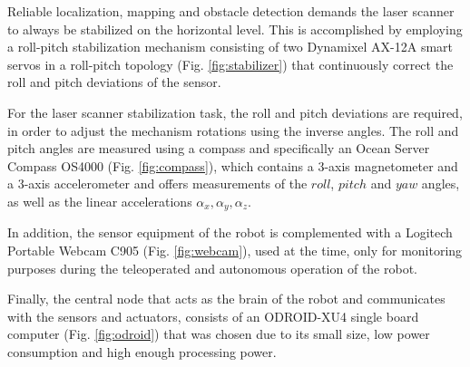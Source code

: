\documentclass[conference]{IEEEtran}
\begin{document}
Reliable localization, mapping and obstacle detection demands the laser scanner to always be stabilized on the horizontal level. This is accomplished by employing a roll-pitch stabilization mechanism consisting of two Dynamixel AX-12A smart servos in a roll-pitch topology (Fig. \ref{fig:stabilizer}) that continuously correct the roll and pitch deviations of the sensor.

For the laser scanner stabilization task, the roll and pitch deviations are required, in order to adjust the mechanism rotations using the inverse angles. The roll and pitch angles are measured using a compass and specifically an Ocean Server Compass OS4000 (Fig. \ref{fig:compass}), which contains a 3-axis magnetometer and a 3-axis accelerometer and offers measurements of the $roll$, $pitch$ and $yaw$ angles, as well as the linear accelerations $\alpha_x, \alpha_y, \alpha_z$.

In addition, the sensor equipment of the robot is complemented with a Logitech Portable Webcam C905 (Fig. \ref{fig:webcam}), used at the time, only for monitoring purposes during the teleoperated and autonomous operation of the robot.

Finally, the central node that acts as the brain of the robot and communicates with the sensors and actuators, consists of an ODROID-XU4 single board computer (Fig. \ref{fig:odroid}) that was chosen due to its small size, low power consumption and high enough processing power.
\end{document}
